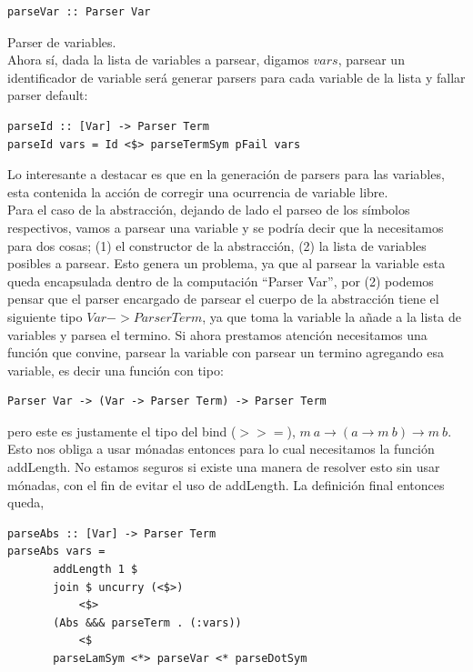 \documentclass[a4paper,10pt]{article}
\begin{document}
\begin{lstlisting}
parseVar :: Parser Var
\end{lstlisting} Parser de variables.\\

Ahora sí, dada la lista de variables a parsear, digamos $vars$, parsear un
identificador de variable será generar parsers para cada variable de la lista
y fallar parser default:

\begin{lstlisting}
parseId :: [Var] -> Parser Term
parseId vars = Id <$> parseTermSym pFail vars
\end{lstlisting}

Lo interesante a destacar es que en la generación de parsers para las variables,
esta contenida la acción de corregir una ocurrencia de variable libre.\\

Para el caso de la abstracción, dejando de lado el parseo de los símbolos respectivos,
vamos a parsear una variable y se podría decir que la necesitamos para dos cosas;
(1) el constructor de la abstracción, (2) la lista de variables posibles a parsear.
Esto genera un problema, ya que al parsear la variable esta queda encapsulada 
dentro de la computación ``Parser Var'', por (2) podemos pensar que el parser encargado
de parsear el cuerpo de la abstracción tiene el siguiente tipo $Var -> Parser Term$,
ya que toma la variable la añade a la lista de variables y parsea el termino.
Si ahora prestamos atención necesitamos una función que convine, parsear la variable con
parsear un termino agregando esa variable, es decir una función con tipo:

\begin{lstlisting}
Parser Var -> (Var -> Parser Term) -> Parser Term
\end{lstlisting}

pero este es justamente el tipo del bind ($>>=$), $m \ a \rightarrow (a \rightarrow m \ b) \rightarrow m \ b$. Esto
nos obliga a usar mónadas entonces para lo cual necesitamos la función addLength.
No estamos seguros si existe una manera de resolver esto sin usar mónadas, con el
fin de evitar el uso de addLength. La definición final entonces queda,

\begin{lstlisting}
parseAbs :: [Var] -> Parser Term
parseAbs vars = 
       addLength 1 $
       join $ uncurry (<$>) 
           <$> 
       (Abs &&& parseTerm . (:vars))
       	   <$ 
       parseLamSym <*> parseVar <* parseDotSym
\end{lstlisting}
\end{document}
